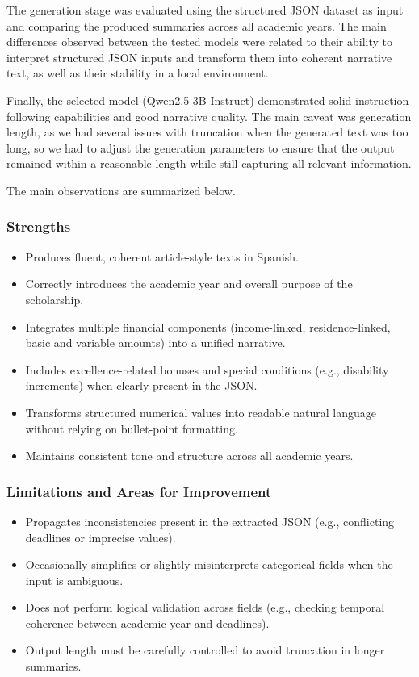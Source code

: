 \documentclass{article}
\begin{document}
The generation stage was evaluated using the structured JSON dataset as input and comparing the produced summaries across all academic years. 
The main differences observed between the tested models were related to their ability to interpret structured JSON inputs and transform them into coherent narrative text, as well as their stability in a local environment.

Finally, the selected model (Qwen2.5-3B-Instruct) demonstrated solid instruction-following capabilities and good narrative quality. The main caveat was generation length, as we had several issues with truncation when the generated text was too long, so we had to adjust the generation parameters to ensure that the output remained within a reasonable length while still capturing all relevant information.

The main observations are summarized below.

\subsubsection{Strengths}

\begin{itemize}
    \item Produces fluent, coherent article-style texts in Spanish.
    \item Correctly introduces the academic year and overall purpose of the scholarship.
    \item Integrates multiple financial components (income-linked, residence-linked, basic and variable amounts) into a unified narrative.
    \item Includes excellence-related bonuses and special conditions (e.g., disability increments) when clearly present in the JSON.
    \item Transforms structured numerical values into readable natural language without relying on bullet-point formatting.
    \item Maintains consistent tone and structure across all academic years.
\end{itemize}

\subsubsection{Limitations and Areas for Improvement}

\begin{itemize}
    \item Propagates inconsistencies present in the extracted JSON (e.g., conflicting deadlines or imprecise values).
    \item Occasionally simplifies or slightly misinterprets categorical fields when the input is ambiguous.
    \item Does not perform logical validation across fields (e.g., checking temporal coherence between academic year and deadlines).
    \item Output length must be carefully controlled to avoid truncation in longer summaries.
\end{itemize}
\end{document}
